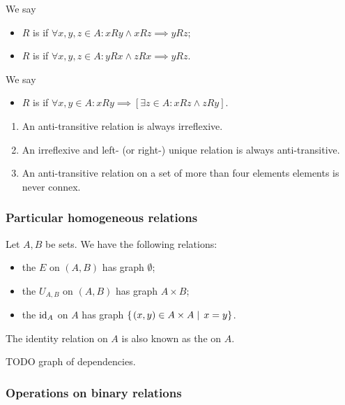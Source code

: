 \begin{definition}
\begin{itemize}
\end{itemize}
We say
\begin{itemize}
\item $R$ is  if $\forall x,y,z\in A: xRy \land xRz \implies yRz$;
\item $R$ is  if $\forall x,y,z\in A: yRx \land zRx \implies yRz$.
\end{itemize}
We say
\begin{itemize}
\item $R$ is  if $\forall x,y\in A: xRy \implies [\exists z\in A: xRz \land zRy]$.
\end{itemize}
\end{definition}

\begin{lemma}
\begin{enumerate}
\item An anti-transitive relation is always irreflexive.
\item An irreflexive and left- (or right-) unique relation is always anti-transitive.
\item An anti-transitive relation on a set of more than four elements elements is never connex.
\end{enumerate}
\end{lemma}

\subsubsection{Particular homogeneous relations}
\begin{definition}
Let $A,B$ be sets. We have the following relations:
\begin{itemize}
\item the  $E$ on $(A, B)$ has graph $\emptyset$;
\item the  $U_{A,B}$ on $(A, B)$ has graph $A\times B$;
\item the  $\operatorname{id}_A$ on $A$ has graph $\left\{\left. (x,y)\in A\times A \;\right|\; x=y \right\}$.
\end{itemize}
\end{definition}
The identity relation on $A$ is also known as the  on $A$.

TODO graph of dependencies.

\subsubsection{Operations on binary relations}
